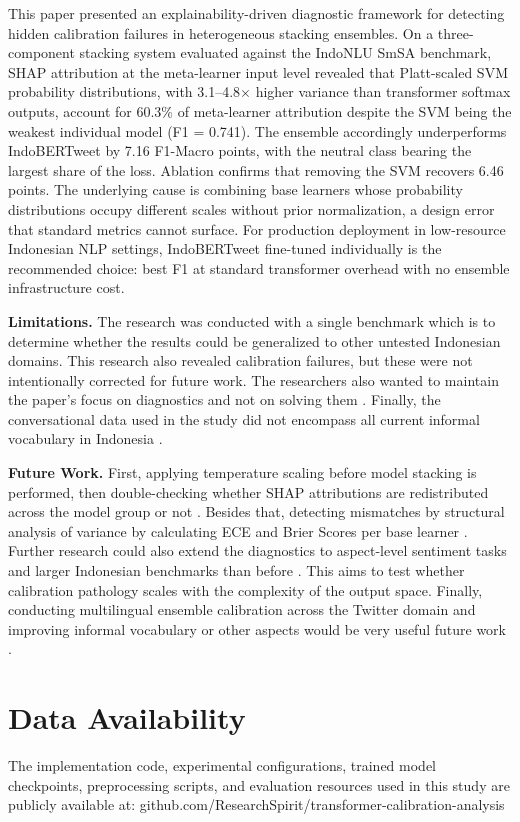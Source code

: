 \documentclass[conference]{IEEEtran}
\begin{document}
This paper presented an explainability-driven diagnostic framework for detecting hidden calibration failures in heterogeneous stacking ensembles. On a three-component stacking system evaluated against the IndoNLU SmSA benchmark, SHAP attribution at the meta-learner input level revealed that Platt-scaled SVM probability distributions, with 3.1--4.8$\times$ higher variance than transformer softmax outputs, account for 60.3\% of meta-learner attribution despite the SVM being the weakest individual model (F1 = 0.741). The ensemble accordingly underperforms IndoBERTweet by 7.16 F1-Macro points, with the neutral class bearing the largest share of the loss. Ablation confirms that removing the SVM recovers 6.46 points. The underlying cause is combining base learners whose probability distributions occupy different scales without prior normalization, a design error that standard metrics cannot surface. For production deployment in low-resource Indonesian NLP settings, IndoBERTweet fine-tuned individually is the recommended choice: best F1 at standard transformer overhead with no ensemble infrastructure cost.

\textbf{Limitations.} The research was conducted with a single benchmark which is to determine whether the results could be generalized to other untested Indonesian domains. This research also revealed calibration failures, but these were not intentionally corrected for future work. The researchers also wanted to maintain the paper's focus on diagnostics and not on solving them \cite{b15}. Finally, the conversational data used in the study did not encompass all current informal vocabulary in Indonesia \cite{b14}.

\textbf{Future Work.} First, applying temperature scaling before model stacking is performed, then double-checking whether SHAP attributions are redistributed across the model group or not \cite{b15}. Besides that, detecting mismatches by structural analysis of variance by calculating ECE and Brier Scores per base learner \cite{b23}. Further research could also extend the diagnostics to aspect-level sentiment tasks \cite{b24} and larger Indonesian benchmarks than before \cite{b19}. This aims to test whether calibration pathology scales with the complexity of the output space. Finally, conducting multilingual ensemble calibration across the Twitter domain \cite{b29} and improving informal vocabulary or other aspects would be very useful future work \cite{b21}.

\section*{Data Availability}
The implementation code, experimental configurations, trained model checkpoints, preprocessing scripts, and evaluation resources used in this study are publicly available at:
github.com/ResearchSpirit/transformer-calibration-analysis
\end{document}
